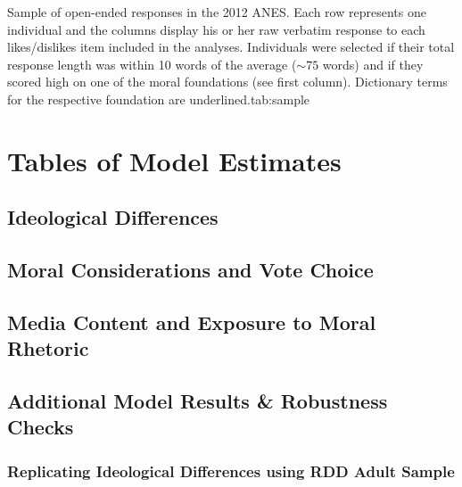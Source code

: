 \documentclass[12pt]{article}
\begin{document}
{\begin{tabular}{ | l | p{2.1cm} | p{2.1cm} | p{2.1cm} | p{2.1cm} | p{2.1cm} | p{2.1cm} | p{2.1cm} | p{2.1cm} | }
    \end{tabular}
}{%
Sample of open-ended responses in the 2012 ANES. Each row represents one individual and the columns display his or her raw verbatim response to each likes/dislikes item included in the analyses. Individuals were selected if their total response length was within 10 words of the average ($\sim75$ words) and if they scored high on one of the moral foundations (see first column). Dictionary terms for the respective foundation are underlined.}{tab:sample}


\clearpage
\section{Tables of Model Estimates}\label{app:tables}
\renewcommand\thefigure{\thesection.\arabic{figure}}
\renewcommand\thetable{\thesection.\arabic{table}}
\setcounter{figure}{0}
\setcounter{table}{0}


\subsection{Ideological Differences}


\clearpage
\subsection{Moral Considerations and Vote Choice}


\clearpage
\subsection{Media Content and Exposure to Moral Rhetoric}


\clearpage
\subsection{Additional Model Results \& Robustness Checks}

\vspace{2em}
\subsubsection*{Replicating Ideological Differences using RDD Adult Sample}


\clearpage
\end{document}
